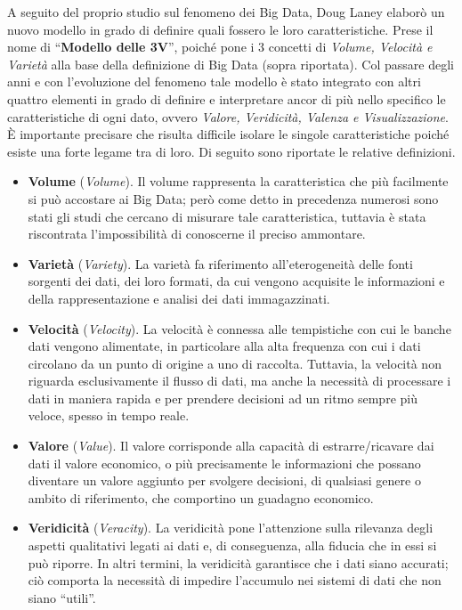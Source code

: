 A seguito del proprio studio sul fenomeno dei Big Data, Doug Laney elaborò un nuovo modello in grado di definire quali fossero le loro caratteristiche. Prese il nome di “\textbf{Modello delle 3V}”, poiché pone i 3 concetti di \textit{Volume, Velocità e Varietà} alla base della definizione di Big Data (sopra riportata). Col passare degli anni e con l’evoluzione del fenomeno tale modello è stato integrato con altri quattro elementi in grado di definire e interpretare ancor di più nello specifico le caratteristiche di ogni dato, ovvero \textit{Valore, Veridicità, Valenza e Visualizzazione}. È importante precisare che risulta difficile isolare le singole caratteristiche poiché esiste una forte legame tra di loro. Di seguito sono riportate le relative definizioni.\cite{agcom_big_data}
\begin{itemize}
    \item \textbf{Volume} (\textit{Volume}). Il volume rappresenta la caratteristica che più facilmente si può accostare ai Big Data; però come detto in precedenza numerosi sono stati gli studi che cercano di misurare tale caratteristica, tuttavia è stata riscontrata l’impossibilità di conoscerne il preciso ammontare.
    \item \textbf{Varietà} (\textit{Variety}). La varietà fa riferimento all’eterogeneità delle fonti sorgenti dei dati, dei loro formati, da cui vengono acquisite le informazioni e della rappresentazione e analisi dei dati immagazzinati.
    \item \textbf{Velocità} (\textit{Velocity}). La velocità è connessa alle tempistiche con cui le banche dati vengono alimentate, in particolare alla alta frequenza con cui i dati circolano da un punto di origine a uno di raccolta. Tuttavia, la velocità non riguarda esclusivamente il flusso di dati, ma anche la necessità di processare i dati in maniera rapida e per prendere decisioni ad un ritmo sempre più veloce, spesso in tempo reale.
    \item \textbf{Valore} (\textit{Value}). Il valore corrisponde alla capacità di estrarre/ricavare dai dati il valore economico, o più precisamente le informazioni che possano diventare un valore aggiunto per svolgere decisioni, di qualsiasi genere o ambito di riferimento, che comportino un guadagno economico. 
    \item \textbf{Veridicità} (\textit{Veracity}). La veridicità pone l’attenzione sulla rilevanza degli aspetti qualitativi legati ai dati e, di conseguenza, alla fiducia che in essi si può riporre. In altri termini, la veridicità garantisce che i dati siano accurati; ciò comporta la necessità di impedire l’accumulo nei sistemi di dati che non siano “utili”.

\end{itemize}
